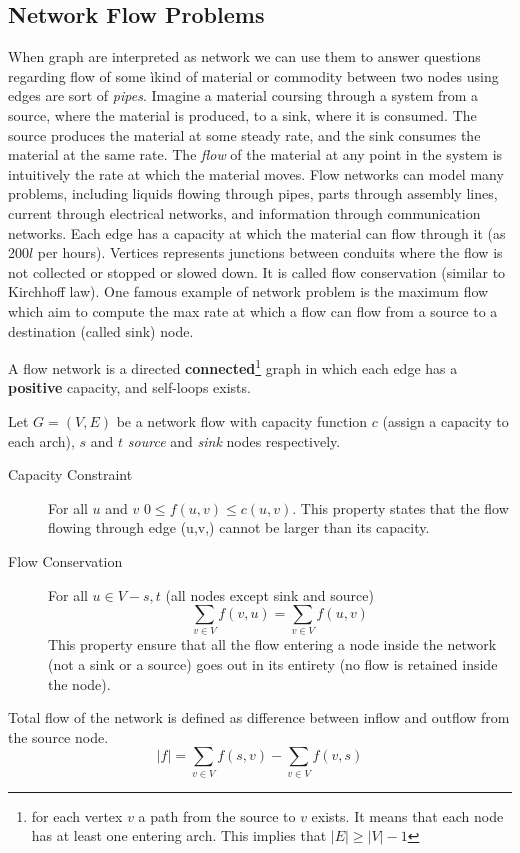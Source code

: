 \subsection{Network Flow Problems}
When graph are interpreted as network we can use them to answer questions regarding flow of some ìkind of material or commodity between two nodes using edges are sort of \textit{pipes}.
Imagine a material coursing through a system from a source, where the material is produced, to
a sink, where it is consumed. The source produces the material at some steady rate, and the sink consumes the material at the same rate. The \textit{flow} of the material at any point in the system is intuitively the rate at which the material moves. Flow networks can model many problems, including liquids flowing through pipes,
parts through assembly lines, current through electrical networks, and information through communication networks.
Each edge has a capacity at which the material can flow through it (as 200$l$ per hours). Vertices represents junctions between conduits where the flow is not collected or stopped or slowed down. It is called flow conservation (similar to Kirchhoff law).
One famous example of network problem is the maximum flow which aim to compute the max rate at which a flow can flow from a source to a destination (called sink) node. 

A flow network is a directed \textbf{connected}\footnote{for each vertex $v$ a path from the source to $v$ exists. It means that each node has at least one entering arch. This implies that $|E| \geq |V| -1$} graph in which each edge has a \textbf{positive} capacity, and self-loops  exists.

Let $G=(V,E)$ be a network flow with capacity function $c$ (assign a capacity to each arch), $s$ and $t$ \textit{source} and \textit{sink} nodes respectively.

\begin{description}
\item [Capacity Constraint] For all $u$ and $v$ $0 	\leq f(u,v) \leq c(u,v)$. This property states that the flow flowing through edge (u,v,) cannot be larger than its capacity.
\item [Flow Conservation] For all $u \in V - {s,t} $ (all nodes except sink and source)
\[
	\sum_{v \in V} f(v,u) = \sum_{v \in V} f(u,v)
\]
This property ensure that all the flow entering a node inside the network (not a sink or a source) goes out in its entirety (no flow is retained inside the node).

\end{description}
Total flow of the network is defined as difference between inflow and outflow from the source node.
\[
|f| = \sum_{v \in V} f(s,v) - \sum_{v \in V} f(v,s)
\]

